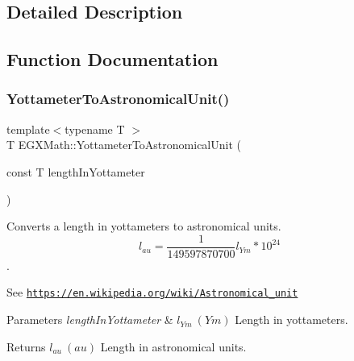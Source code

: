 \subsection{Detailed Description}


\subsection{Function Documentation}
\mbox{\label{group___e_g_x_math-_conversions-_length_conversions-_yottameter-_astronomical_gab75681ecd108900ae547e58495a62dd3}} 
\subsubsection{\texorpdfstring{Yottameter\+To\+Astronomical\+Unit()}{YottameterToAstronomicalUnit()}}
{\footnotesize\ttfamily template$<$typename T $>$ \\
T E\+G\+X\+Math\+::\+Yottameter\+To\+Astronomical\+Unit (\begin{DoxyParamCaption}\item[{const T}]{length\+In\+Yottameter }\end{DoxyParamCaption})}



Converts a length in yottameters to astronomical units. \[ l_{au}= \frac{1}{149597870700} l_{Ym} * 10^{24} \]. 

See \href{https://en.wikipedia.org/wiki/Astronomical_unit}{\tt https\+://en.\+wikipedia.\+org/wiki/\+Astronomical\+\_\+unit} 
\begin{DoxyParams}{Parameters}
{\em length\+In\+Yottameter} & $ l_{Ym}\ (Ym)$ Length in yottameters. \\
\hline
\end{DoxyParams}
\begin{DoxyReturn}{Returns}
$ l_{au}\ (au)$ Length in astronomical units. 
\end{DoxyReturn}
\mbox{\label{group___e_g_x_math-_conversions-_length_conversions-_yottameter-_astronomical_ga0ab87688c8dea9fb838a3bca34cba82c}} 
